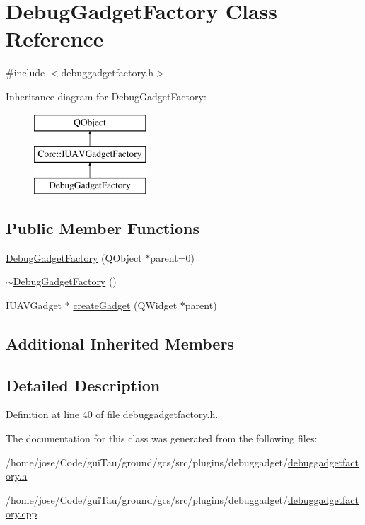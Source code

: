 \hypertarget{class_debug_gadget_factory}{\section{Debug\-Gadget\-Factory Class Reference}
\label{class_debug_gadget_factory}
}


{\ttfamily \#include $<$debuggadgetfactory.\-h$>$}

Inheritance diagram for Debug\-Gadget\-Factory\-:\begin{figure}[H]
\begin{center}
\leavevmode
\includegraphics[height=3.000000cm]{class_debug_gadget_factory}
\end{center}
\end{figure}
\subsection*{Public Member Functions}
\begin{DoxyCompactItemize}
\item 
\hyperlink{group___debug_gadget_plugin_ga48259f8b08f0767ab22c4b022643e134}{Debug\-Gadget\-Factory} (Q\-Object $\ast$parent=0)
\item 
\hyperlink{group___debug_gadget_plugin_gadb2d9eecc3b92fc56cf849ffd7230e91}{$\sim$\-Debug\-Gadget\-Factory} ()
\item 
I\-U\-A\-V\-Gadget $\ast$ \hyperlink{group___debug_gadget_plugin_ga24e00530d01c4d1874ac8395caa2370c}{create\-Gadget} (Q\-Widget $\ast$parent)
\end{DoxyCompactItemize}
\subsection*{Additional Inherited Members}


\subsection{Detailed Description}


Definition at line 40 of file debuggadgetfactory.\-h.



The documentation for this class was generated from the following files\-:\begin{DoxyCompactItemize}
\item 
/home/jose/\-Code/gui\-Tau/ground/gcs/src/plugins/debuggadget/\hyperlink{debuggadgetfactory_8h}{debuggadgetfactory.\-h}\item 
/home/jose/\-Code/gui\-Tau/ground/gcs/src/plugins/debuggadget/\hyperlink{debuggadgetfactory_8cpp}{debuggadgetfactory.\-cpp}\end{DoxyCompactItemize}

